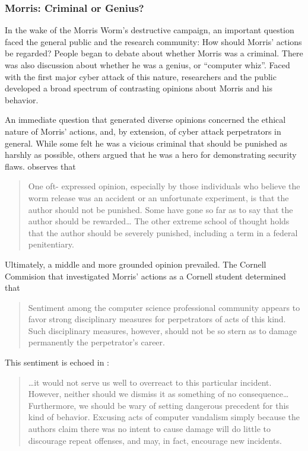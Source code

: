 \subsubsection*{Morris: Criminal or Genius?}
In the wake of the Morris Worm's destructive campaign, an important question
faced the general public and the research community: How should Morris' actions
be regarded? People began to debate about whether Morris was a criminal. There
was also discussion about whether he was a genius, or ``computer whiz''. Faced
with the first major cyber attack of this nature, researchers and the public
developed a broad spectrum of contrasting opinions about Morris and his
behavior.

An immediate question that generated diverse opinions concerned the ethical
nature of Morris' actions, and, by extension, of cyber attack perpetrators in
general. While some felt he was a vicious criminal that should be
punished as harshly as possible, others argued that he was a hero for
demonstrating security flaws. \cite{spafford_crisis_1989} observes that 
\begin{quote}
One oft- expressed opinion, especially by those individuals who believe the
worm release was an accident or an unfortunate experiment, is that the author
should not be punished. Some have gone so far as to say that the author should
be rewarded\ldots
The other extreme school of thought holds that the author should be severely
punished, including a term in a federal penitentiary.
\end{quote}

Ultimately, a middle and more grounded opinion prevailed. The Cornell Commision
that investigated Morris' actions as a Cornell student determined that 
\begin{quote}
Sentiment among the computer science professional community appears to favor
strong disciplinary measures for perpetrators of acts of this kind. Such
disciplinary measures, however, should not be so stern as to damage permanently
the perpetrator's career.
\end{quote}

This sentiment is echoed in \cite{spafford_crisis_1989}:
\begin{quote}
\ldots it would not serve us well to overreact to this particular incident.
However, neither should we dismiss it as something of no consequence\ldots
Furthermore, we should be wary of setting dangerous precedent for this kind of
behavior. Excusing acts of computer vandalism simply because the authors claim
there was no intent to cause damage will do little to discourage repeat
offenses, and may, in fact, encourage new incidents.
\end{quote}

